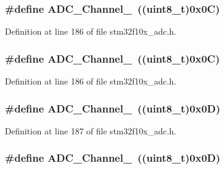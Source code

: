 \subsubsection[{\texorpdfstring{A\+D\+C\+\_\+\+Channel\+\_\+12}{ADC_Channel_12}}]{\setlength{\rightskip}{0pt plus 5cm}\#define A\+D\+C\+\_\+\+Channel\+\_~(({\bf uint8\+\_\+t})0x0\+C)}\hypertarget{group___a_d_c__channels_gaa1e35f7870ae8f05013a681293175299}{}\label{group___a_d_c__channels_gaa1e35f7870ae8f05013a681293175299}


Definition at line 186 of file stm32f10x\+\_\+adc.\+h.

\subsubsection[{\texorpdfstring{A\+D\+C\+\_\+\+Channel\+\_\+12}{ADC_Channel_12}}]{\setlength{\rightskip}{0pt plus 5cm}\#define A\+D\+C\+\_\+\+Channel\+\_~(({\bf uint8\+\_\+t})0x0\+C)}\hypertarget{group___a_d_c__channels_gaa1e35f7870ae8f05013a681293175299}{}\label{group___a_d_c__channels_gaa1e35f7870ae8f05013a681293175299}


Definition at line 186 of file stm32f10x\+\_\+adc.\+h.

\subsubsection[{\texorpdfstring{A\+D\+C\+\_\+\+Channel\+\_\+13}{ADC_Channel_13}}]{\setlength{\rightskip}{0pt plus 5cm}\#define A\+D\+C\+\_\+\+Channel\+\_~(({\bf uint8\+\_\+t})0x0\+D)}\hypertarget{group___a_d_c__channels_ga517cda911256f722eb067d7140663230}{}\label{group___a_d_c__channels_ga517cda911256f722eb067d7140663230}


Definition at line 187 of file stm32f10x\+\_\+adc.\+h.

\subsubsection[{\texorpdfstring{A\+D\+C\+\_\+\+Channel\+\_\+13}{ADC_Channel_13}}]{\setlength{\rightskip}{0pt plus 5cm}\#define A\+D\+C\+\_\+\+Channel\+\_~(({\bf uint8\+\_\+t})0x0\+D)}\hypertarget{group___a_d_c__channels_ga517cda911256f722eb067d7140663230}{}\label{group___a_d_c__channels_ga517cda911256f722eb067d7140663230}


